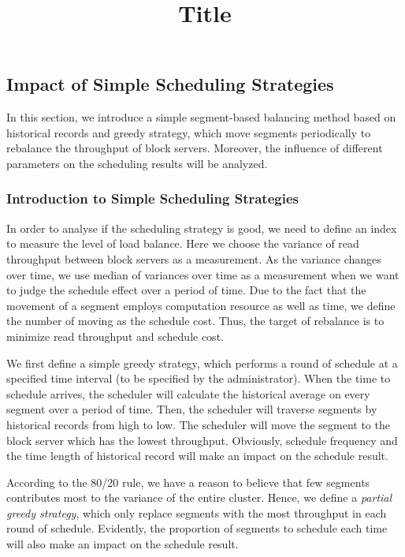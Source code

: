 \documentclass[letterpaper,twocolumn,10pt]{article}
\begin{document}
\date{}


\title{Title}

\author{

} %

\maketitle 
\subsection{Impact of Simple Scheduling Strategies}
\label{sec3.2-0}

In this section, we introduce a simple segment-based
balancing method based on historical records and 
greedy strategy, which move segments periodically to 
rebalance the throughput of block servers.
Moreover, the influence of different parameters on
the scheduling results will be analyzed.

\subsubsection{Introduction to Simple Scheduling 
Strategies} \label{sec3.2-1}

In order to analyse if the scheduling strategy is good, 
we need to define an index to measure the level of load
balance. Here we choose the variance of read throughput
between block servers as a measurement. As the variance
changes over time, we use median of variances over time
as a measurement when we want to judge the schedule
effect over a period of time. Due to the fact that the
movement of a segment employs computation resource as
well as time, we define the number of moving as the 
schedule cost. Thus, the target of rebalance is to
minimize read throughput and schedule cost.

We first define a simple greedy strategy, which 
performs a round of schedule at a specified time
interval (to be specified by the administrator).
When the time to schedule arrives, the scheduler 
will calculate the historical average on every 
segment over a period of time. Then, the scheduler 
will traverse segments by historical records from
high to low. The scheduler will move the segment to
the block server which has the lowest throughput.
Obviously, schedule frequency and the time length of 
historical record will make an impact on the schedule 
result.

According to the 80/20 rule, we have a reason to believe
that few segments contributes most to the variance of the
entire cluster. Hence, we define a \textit{partial greedy
strategy}, which only replace segments with the most
throughput in each round of schedule. Evidently, the
proportion of segments to schedule each time will also make
an impact on the schedule result.
\end{document}
